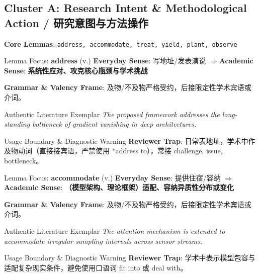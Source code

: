 \subsection{Cluster A: Research Intent \& Methodological Action / 研究意图与方法操作}
\noindent\textbf{\color{AcadSlate}Core Lemmas}: \texttt{address, accommodate, treat, yield, plant, observe}\par\vspace{4pt}
\begin{ConceptBox}{Lemma Focus: \textbf{address} (v.)}
\textbf{Everyday Sense}: 写地址/发表演说 \quad$\Longrightarrow$\quad \textbf{Academic Sense}: \textbf{系统性应对、攻克核心瓶颈与学术挑战}\par\vspace{3pt}
\textbf{Grammar \& Valency Frame}: 及物/不及物严格受约，后接限定性学术宾语或介词。\par
\end{ConceptBox}
\begin{ExampleBox}{Authentic Literature Exemplar}
\textit{The proposed framework addresses the long-standing bottleneck of gradient vanishing in deep architectures.}
\end{ExampleBox}
\begin{TipBox}{Usage Boundary \& Diagnostic Warning}
\textbf{Reviewer Trap}: 日常表地址，学术中作及物动词（直接接宾语，严禁使用 *address to），常接 challenge, issue, bottleneck。
\end{TipBox}
\vspace{6pt}
\begin{ConceptBox}{Lemma Focus: \textbf{accommodate} (v.)}
\textbf{Everyday Sense}: 提供住宿/容纳 \quad$\Longrightarrow$\quad \textbf{Academic Sense}: \textbf{（模型架构、理论框架）适配、容纳异质性分布或变化}\par\vspace{3pt}
\textbf{Grammar \& Valency Frame}: 及物/不及物严格受约，后接限定性学术宾语或介词。\par
\end{ConceptBox}
\begin{ExampleBox}{Authentic Literature Exemplar}
\textit{The attention mechanism is extended to accommodate irregular sampling intervals across sensor streams.}
\end{ExampleBox}
\begin{TipBox}{Usage Boundary \& Diagnostic Warning}
\textbf{Reviewer Trap}: 学术中表示模型包容与适配复杂现实条件，避免使用口语词 fit into 或 deal with。
\end{TipBox}
\vspace{6pt}
